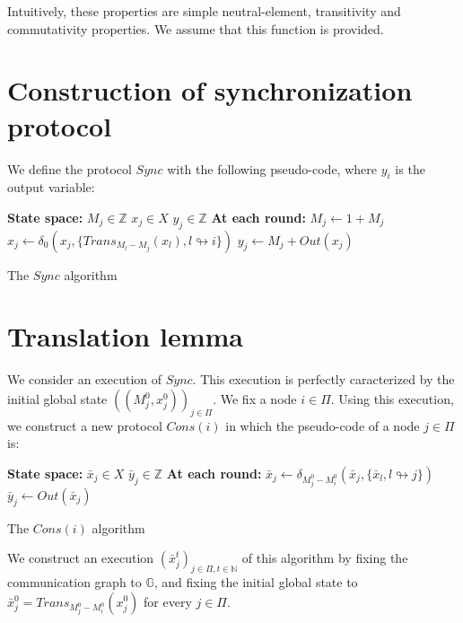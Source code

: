 \documentclass[11pt,letterpaper]{article}
\begin{document}
\noindent Intuitively, these properties are simple neutral-element, transitivity and commutativity properties.
We assume that this function is provided.

\section{Construction of synchronization protocol}

We define the protocol $Sync$ with the following pseudo-code, where $y_i$ is the output variable:

\begin{algorithm}[H]
	\DontPrintSemicolon
	\textbf{State space:} \;
	\Indp
		$M_j \in \mathds{Z}$ \;
		$x_j \in X$ \;
		$y_j \in \mathds{Z}$ \;
	\BlankLine
	\Indm
	\textbf{At each round:} \;
	\Indp
		$M_j \leftarrow 1+M_j$ \;
		$x_j \leftarrow \delta_0(x_j, \{Trans_{M_l - M_j}(x_l), l \looparrowright i\})$ \;
		$y_j \leftarrow M_j+Out(x_j)$ \;
	\Indm
\caption{The $Sync$ algorithm} 
\end{algorithm}

\section{Translation lemma}

We consider an execution of $Sync$.
This execution is perfectly caracterized by the initial global state $((M_j^0, x_j^0))_{j \in \Pi}$.
We fix a node $i \in \Pi$.
Using this execution, we construct a new protocol $Cons(i)$ in which the pseudo-code of a node $j \in \Pi$ is:

\begin{algorithm}[H]
	\DontPrintSemicolon
	\textbf{State space:} \;
	\Indp
		$\bar x_j \in X$ \;
		$\bar y_j \in \mathds{Z}$ \;
	\BlankLine
	\Indm
	\textbf{At each round:} \;
	\Indp
		$\bar x_j \leftarrow \delta_{M_j^0 - M_i^0}(\bar x_j, \{\bar x_l, l \looparrowright j\})$ \;
		$\bar y_j \leftarrow Out(\bar x_j)$ \;
	\Indm
	\caption{The $Cons(i)$ algorithm} 
\end{algorithm}

We construct an execution $(\bar x_j^t)_{j \in \Pi, t \in \mathds{N}}$ of this algorithm by fixing the communication graph to $\mathds{G}$,
and fixing the initial global state to $\bar x_j^0 = Trans_{M_j^0 - M_i^0}(x_j^0)$ for every $j \in \Pi$.
\end{document}

